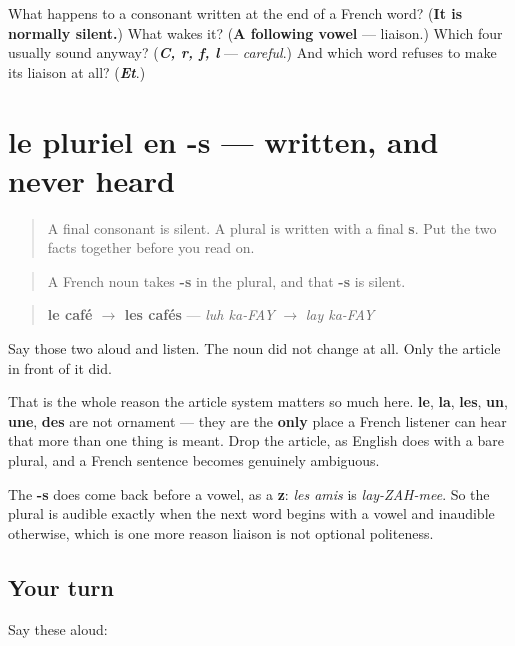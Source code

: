 \begin{tcolorbox}[breakable,colback=teal!4,colframe=teal!35!black,title={Before you move on}]
What happens to a consonant written at the end of a French word? (\textbf{It is normally silent.}) What wakes it? (\textbf{A following vowel} — liaison.) Which four usually sound anyway? (\emph{\textbf{C, r, f, l}} — \emph{careful}.) And which word refuses to make its liaison at all? (\emph{\textbf{Et}}.)
\end{tcolorbox}
\section[le plural en -s]{le pluriel en -s — written, and never heard}

\label{lesson:FR-C38-pluriel-s}



\begin{quote}
A final consonant is silent. A plural is written with a final \textbf{s}. Put the two facts together before you read on.
\end{quote}

\begin{cousinweb}
\begin{quote}
A French noun takes \textbf{-s} in the plural, and that \textbf{-s} is silent.
\end{quote}

\begin{quote}
\textbf{le café $\to$ les cafés} — \emph{luh ka-FAY} $\to$ \emph{lay ka-FAY}
\end{quote}

Say those two aloud and listen. The noun did not change at all. Only the article in front of it did.

That is the whole reason the article system matters so much here. \textbf{le}, \textbf{la}, \textbf{les}, \textbf{un}, \textbf{une}, \textbf{des} are not ornament — they are the \textbf{only} place a French listener can hear that more than one thing is meant. Drop the article, as English does with a bare plural, and a French sentence becomes genuinely ambiguous.

The \textbf{-s} does come back before a vowel, as a \textbf{z}: \emph{les amis} is \emph{lay-ZAH-mee}. So the plural is audible exactly when the next word begins with a vowel and inaudible otherwise, which is one more reason liaison is not optional politeness.
\end{cousinweb}

\subsection*{Your turn}
Say these aloud:

